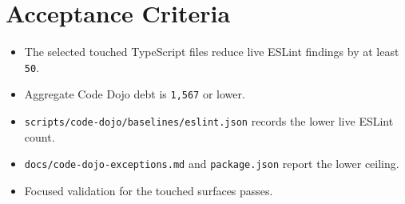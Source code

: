 \section{Acceptance Criteria}\label{record-225-acceptance-criteria}

\begin{itemize}
\tightlist
\item
  The selected touched TypeScript files reduce live ESLint findings by at least \texttt{5\allowbreak{}0}.
\item
  Aggregate Code Dojo debt is \texttt{1\allowbreak{},\allowbreak{}5\allowbreak{}6\allowbreak{}7} or lower.
\item
  \texttt{s\allowbreak{}c\allowbreak{}r\allowbreak{}i\allowbreak{}p\allowbreak{}t\allowbreak{}s\allowbreak{}/\allowbreak{}c\allowbreak{}o\allowbreak{}d\allowbreak{}e\allowbreak{}-\allowbreak{}d\allowbreak{}o\allowbreak{}j\allowbreak{}o\allowbreak{}/\allowbreak{}b\allowbreak{}a\allowbreak{}s\allowbreak{}e\allowbreak{}l\allowbreak{}i\allowbreak{}n\allowbreak{}e\allowbreak{}s\allowbreak{}/\allowbreak{}e\allowbreak{}s\allowbreak{}l\allowbreak{}i\allowbreak{}n\allowbreak{}t\allowbreak{}.\allowbreak{}j\allowbreak{}s\allowbreak{}o\allowbreak{}n} records the lower live ESLint count.
\item
  \texttt{d\allowbreak{}o\allowbreak{}c\allowbreak{}s\allowbreak{}/\allowbreak{}c\allowbreak{}o\allowbreak{}d\allowbreak{}e\allowbreak{}-\allowbreak{}d\allowbreak{}o\allowbreak{}j\allowbreak{}o\allowbreak{}-\allowbreak{}e\allowbreak{}x\allowbreak{}c\allowbreak{}e\allowbreak{}p\allowbreak{}t\allowbreak{}i\allowbreak{}o\allowbreak{}n\allowbreak{}s\allowbreak{}.\allowbreak{}m\allowbreak{}d} and \texttt{p\allowbreak{}a\allowbreak{}c\allowbreak{}k\allowbreak{}a\allowbreak{}g\allowbreak{}e\allowbreak{}.\allowbreak{}j\allowbreak{}s\allowbreak{}o\allowbreak{}n} report the lower ceiling.
\item
  Focused validation for the touched surfaces passes.
\end{itemize}

